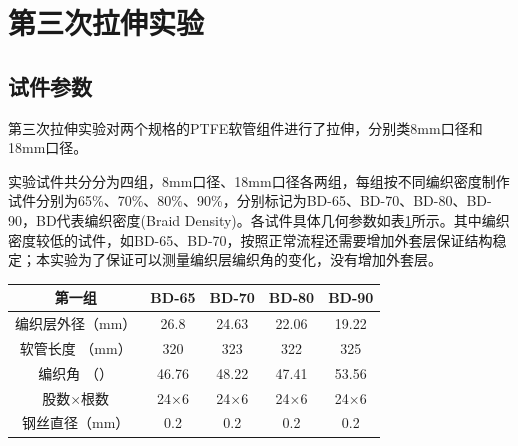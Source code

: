 \newpage
\section{第三次拉伸实验}
\subsection{试件参数}
  第三次拉伸实验对两个规格的PTFE软管组件进行了拉伸，分别类8mm口径和18mm口径。
  
  实验试件共分分为四组，8mm口径、18mm口径各两组，每组按不同编织密度制作试件分别为65\%、70\%、80\%、90\%，分别标记为BD-65、BD-70、BD-80、BD-90，BD代表编织密度(Braid Density)。各试件具体几何参数如表\ref{tab:hose-specimen-III}所示。其中编织密度较低的试件，如BD-65、BD-70，按照正常流程还需要增加外套层保证结构稳定；本实验为了保证可以测量编织层编织角的变化，没有增加外套层。
  
  
  
  \begin{table}[!htb]
  	\centering
  	\label{tab:hose-specimen-III}
  	\begin{tabular*}{0.8\textwidth}{@{\extracolsep{\fill}}>{\hspace{0.5cm}}ccccc}
  		\toprule
  		\textbf{第一组}&     BD-65     &     BD-70     &     BD-80     &     BD-90     \\ \midrule
  		编织层外径（mm）  & 26.8         &     24.63     &     22.06     &     19.22       \\
  		软管长度 （mm）    & 320          &      323      &      322      &      325       \\
  		编织角 （\textdegree）   & 46.76 &     48.22     &     47.41     &     53.56     \\
  		股数$ \times $根数          & 24$ \times $6 & 24$ \times $6 & 24$ \times $6 & 24$ \times $6 \\
  		钢丝直径（mm）                &      0.2      &      0.2      &      0.2      &      0.2      \\ \bottomrule
  	\end{tabular*} 
  \end{table}
  
